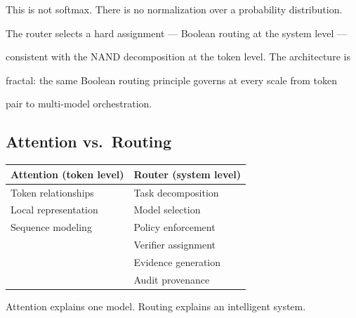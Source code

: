 This is not softmax. There is no normalization over a probability distribution.


The router selects a hard assignment --- Boolean routing at the system level ---


consistent with the NAND decomposition at the token level. The architecture is


fractal: the same Boolean routing principle governs at every scale from token


pair to multi-model orchestration.





\subsection{Attention vs.\ Routing}





\begin{center}


\begin{tabular}{p{5.5cm}p{5.5cm}}


\textbf{Attention (token level)} & \textbf{Router (system level)} \\


\hline


Token relationships & Task decomposition \\


Local representation & Model selection \\


Sequence modeling & Policy enforcement \\


 & Verifier assignment \\


 & Evidence generation \\


 & Audit provenance \\


\end{tabular}


\end{center}





\medskip





Attention explains one model. Routing explains an intelligent system.





